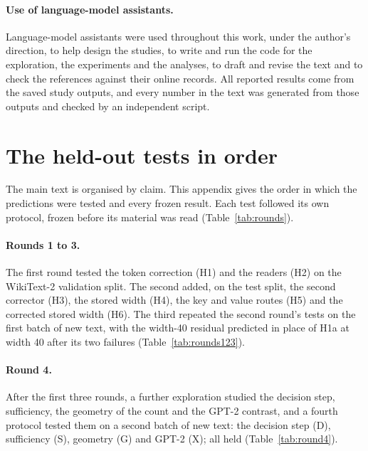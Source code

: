 \documentclass[11pt,a4paper]{article}
\begin{document}
\paragraph{Use of language-model assistants.}
Language-model assistants were used throughout this work, under the author's direction, to help design the studies, to write and run the code for the exploration, the experiments and the analyses, to draft and revise the text and to check the references against their online records. All reported results come from the saved study outputs, and every number in the text was generated from those outputs and checked by an independent script.




\appendix

\section{The held-out tests in order}
\label{app:rounds}

The main text is organised by claim. This appendix gives the order in which the predictions were tested and every frozen result. Each test followed its own protocol, frozen before its material was read (Table~\ref{tab:rounds}).

\paragraph{Rounds 1 to 3.} The first round tested the token correction (H1) and the readers (H2) on the WikiText-2 validation split. The second added, on the test split, the second corrector (H3), the stored width (H4), the key and value routes (H5) and the corrected stored width (H6). The third repeated the second round's tests on the first batch of new text, with the width-40 residual predicted in place of H1a at width 40 after its two failures (Table~\ref{tab:rounds123}).

\paragraph{Round 4.} After the first three rounds, a further exploration studied the decision step, sufficiency, the geometry of the count and the GPT-2 contrast, and a fourth protocol tested them on a second batch of new text: the decision step (D), sufficiency (S), geometry (G) and GPT-2 (X); all held (Table~\ref{tab:round4}).
\end{document}
